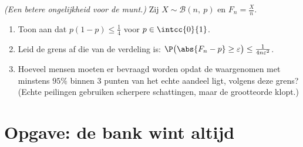 \begin{exercise}[$\star\star\star$]\label{exo:g12:sums:8}
\emph{(Een betere ongelijkheid voor de munt.)} Zij $X \sim \mathcal B(n,\ p)$
en $F_n = \frac Xn$.
\begin{enumerate}
  \item Toon aan dat $p(1-p) \leq \frac14$ voor $p \in \intcc{0}{1}$.
  \item Leid de grens af die van de verdeling  is:
        $\P\bigl(\abs{F_n - p} \geq \varepsilon\bigr) \leq
        \frac{1}{4n\varepsilon^2}$.
  \item Hoeveel mensen moeten er bevraagd worden opdat de waargenomen
         met  minstens $95\%$ binnen $3$ punten van het echte
        aandeel ligt, volgens deze grens? (Echte peilingen gebruiken scherpere
        schattingen, maar de grootteorde klopt.)
\end{enumerate}
\end{exercise}

\section{Opgave: de bank wint altijd}

